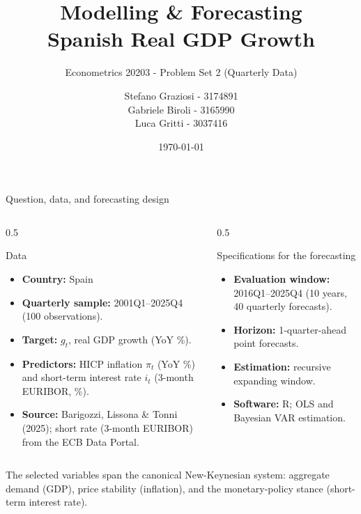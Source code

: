 \documentclass[9pt]{beamer}
\title{\Huge Modelling \& Forecasting\\Spanish Real GDP Growth}
\subtitle{Econometrics 20203 - Problem Set 2 (Quarterly Data)}
\author{Stefano Graziosi - 3174891 \\
        Gabriele Biroli - 3165990 \\
        Luca Gritti - 3037416
        }
\institute{MSc Economic and Social Sciences, Università Bocconi}
\date{\today}
\begin{document}
\maketitle

\begin{frame}{Question, data, and forecasting design}
\label{slide:setup}
\footnotesize

\begin{columns}[T]
\begin{column}{0.5\textwidth}
\begin{block}{Data}
\begin{itemize}\setlength{\itemsep}{1pt}
  \item \textbf{Country:} Spain
  \item \textbf{Quarterly sample:} 2001Q1--2025Q4 (100 observations).
  \item \textbf{Target:} $g_t$, real GDP growth (YoY \%).
  \item \textbf{Predictors:} HICP inflation $\pi_t$ (YoY \%) and short-term interest rate $i_t$ (3-month EURIBOR, \%).
  \item \textbf{Source:} Barigozzi, Lissona \& Tonni (2025); short rate (3-month EURIBOR) from the ECB Data Portal.
\end{itemize}
\end{block}
\end{column}

\begin{column}{0.5\textwidth}
\begin{block}{Specifications for the forecasting}
\begin{itemize}\setlength{\itemsep}{1pt}
  \item \textbf{Evaluation window:} 2016Q1--2025Q4 (10 years, 40 quarterly forecasts).
  \item \textbf{Horizon:} 1-quarter-ahead point forecasts.
  \item \textbf{Estimation:} recursive expanding window.
  \item \textbf{Software:} R; OLS and Bayesian VAR estimation.
\end{itemize}
\end{block}
\end{column}
\end{columns}

\vspace{0.15cm}
The selected variables span the canonical New-Keynesian system: aggregate demand (GDP), price stability (inflation), and the monetary-policy stance (short-term interest rate).

\end{frame}
\end{document}
